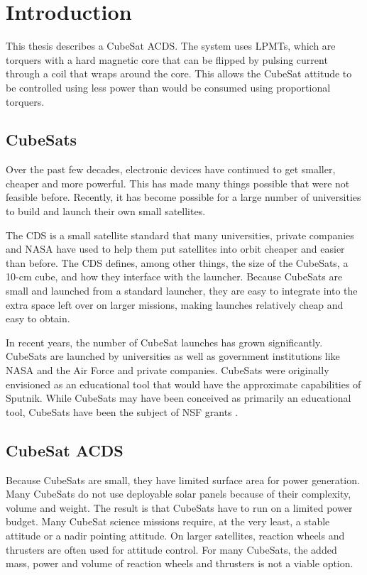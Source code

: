 

\chapter{Introduction}

This thesis describes a CubeSat \ac{ACDS}. The system uses \acfp{LPMT}, which are torquers with a hard magnetic core that can be flipped by pulsing current through a coil that wraps around the core. This allows the CubeSat attitude to be controlled using less power than would be consumed using proportional torquers.

\section{CubeSats}

Over the past few decades, electronic devices have continued to get smaller, cheaper and more powerful. This has made many things possible that were not feasible before. Recently, it has become possible for a large number of universities to build and launch their own small satellites.

The \acf{CDS}\cite{CDS} is a small satellite standard that many universities, private companies and NASA have used to help them put satellites into orbit cheaper and easier than before. The \ac{CDS} defines, among other things, the size of the CubeSats, a 10-cm cube, and how they interface with the launcher. Because CubeSats are small and launched from a standard launcher, they are easy to integrate into the extra space left over on larger missions, making launches relatively cheap and easy to obtain.

In recent years, the number of CubeSat launches has grown significantly. CubeSats are launched by universities as well as government institutions like NASA and the Air Force and private companies. CubeSats were originally envisioned as an educational tool that would have the approximate capabilities of Sputnik. While CubeSats may have been conceived as primarily an educational tool, CubeSats have been the subject of \ac{NSF} grants \cite{NSFcube}.

\section{CubeSat \acs*{ACDS}}

Because CubeSats are small, they have limited surface area for power generation. Many CubeSats do not use deployable solar panels because of their complexity, volume and weight. The result is that CubeSats have to run on a limited power budget. Many CubeSat science missions require, at the very least, a stable attitude or a nadir pointing attitude. On larger satellites, reaction wheels and thrusters are often used for attitude control. For many CubeSats, the added mass, power and volume of reaction wheels and thrusters is not a viable option.


